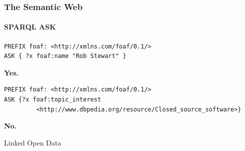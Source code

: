 \documentclass{beamer}
\begin{document}
\begin{frame}[fragile]
\frametitle{The Semantic Web}
\framesubtitle{SPARQL ASK}

\small
\begin{verbatim}
PREFIX foaf: <http://xmlns.com/foaf/0.1/>
ASK { ?x foaf:name "Rob Stewart" }
\end{verbatim}

\begin{center}
\textbf{Yes.}
\end{center}

\bigskip

\small
\begin{verbatim}
PREFIX foaf: <http://xmlns.com/foaf/0.1/>
ASK {?x foaf:topic_interest
         <http://www.dbpedia.org/resource/Closed_source_software>}
\end{verbatim}

\begin{center}
\textbf{No.}
\end{center}


\end{frame}

\begin{frame}

\huge
\begin{center}
Linked Open Data
\end{center}

\end{frame}
\end{document}
